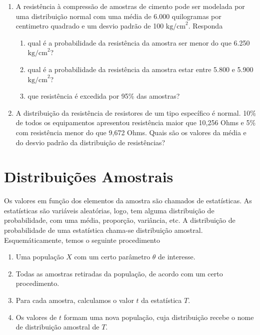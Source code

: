 \documentclass[11pt,fleqn]{book}
\numberwithin{mpicture}{chapter}
\numberwithin{mtable}{chapter}
\numberwithin{mframe}{chapter}
\begin{document}
\begin{exercise}
\begin{multicols}{2}
\begin{enumerate}[label=\textbf{\color{ocre}\arabic*.}, itemsep=20pt]
		\item A resistência à compressão de amostras de cimento pode ser modelada por uma distribuição normal com uma média de 6.000 quilogramas por centimetro quadrado e um desvio padrão de 100 $\text{kg/cm}^2$. Responda
			\begin{enumerate}[label=\textbf{\color{ocre}(\alph*)}]
				\item qual é a probabilidade da resistência da amostra ser menor do que 6.250 $\text{kg/cm}^2$?
				\item qual é a probabilidade da resistência da amostra estar entre 5.800 e 5.900 $\text{kg/cm}^2$?
				\item que resistência é excedida por 95\% das amostras?
			\end{enumerate}
		
		\item A distribuição da resistência de resistores de um tipo específico é normal. 10\% de todos os equipamentos apresentou resistência maior que 10,256 Ohms e 5\% com resistência menor do que 9,672 Ohms. Quais são os valores da média e do desvio padrão da distribuição de resistências?
	\end{enumerate}
	\end{multicols}
\end{exercise}
\newpage\opensidepicturearea

\chapter{Distribuições Amostrais}

Os valores em função dos elementos da amostra são chamados de estatísticas. As estatísticas são variáveis aleatórias, logo, tem alguma distribuição de probabilidade, com uma média, proporção, variância, etc. A distribuição de probabilidade de uma estatística chama-se distribuição amostral. Esquemáticamente, temos o seguinte procedimento
\begin{enumerate}[label=(\roman*)]
	\item Uma população $X$ com um certo parâmetro $\theta$ de interesse.
	\item Todas as amostras retiradas da população, de acordo com um certo procedimento.
	\item Para cada amostra, calculamos o valor $t$ da estatística $T$.
	\item Os valores de $t$ formam uma nova população, cuja distribuição recebe o nome de distribuição amostral de $T$.
\end{enumerate}
\end{document}
